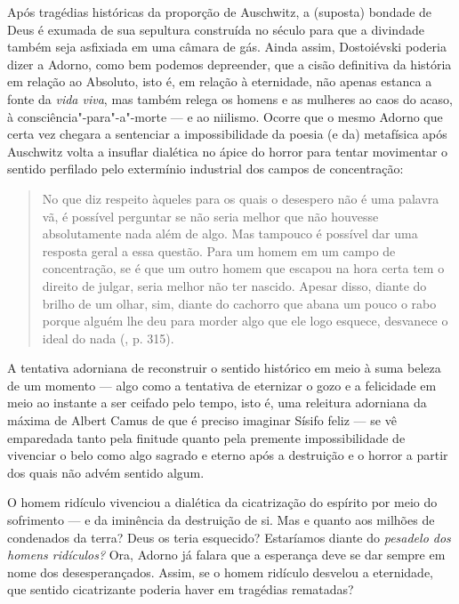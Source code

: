 Após tragédias históricas da proporção de Auschwitz, a (suposta) bondade
de Deus é exumada de sua sepultura construída no século  para que a
divindade também seja asfixiada em uma câmara de gás. Ainda assim,
Dostoiévski poderia dizer a Adorno, como bem podemos depreender, que a
cisão definitiva da história em relação ao Absoluto, isto é, em relação
à eternidade, não apenas estanca a fonte da \emph{vida viva}, mas também
relega os homens e as mulheres ao caos do acaso, à
consciência"-para"-a"-morte --- e ao niilismo. Ocorre que o mesmo Adorno que
certa vez chegara a sentenciar a impossibilidade da poesia (e da)
metafísica após Auschwitz volta a insuflar dialética no ápice do horror
para tentar movimentar o sentido perfilado pelo extermínio industrial
dos campos de concentração:

\begin{quote}
No que diz respeito àqueles para os quais o desespero não é uma palavra
vã, é possível perguntar se não seria melhor que não houvesse
absolutamente nada além de algo. Mas tampouco é possível dar uma
resposta geral a essa questão. Para um homem em um campo de
concentração, se é que um outro homem que escapou na hora certa tem o
direito de julgar, seria melhor não ter nascido. Apesar disso, diante do
brilho de um olhar, sim, diante do cachorro que abana um pouco o rabo
porque alguém lhe deu para morder algo que ele logo esquece, desvanece o
ideal do nada (, p. 315).
\end{quote}

A tentativa adorniana de reconstruir o sentido histórico em meio à suma
beleza de um momento --- algo como a tentativa de eternizar o gozo e a
felicidade em meio ao instante a ser ceifado pelo tempo, isto é, uma
releitura adorniana da máxima de Albert Camus de que é preciso imaginar
Sísifo feliz --- se vê emparedada tanto pela finitude quanto pela
premente impossibilidade de vivenciar o belo como algo sagrado e eterno
após a destruição e o horror a partir dos quais não advém sentido algum.

O homem ridículo vivenciou a dialética da cicatrização do espírito por
meio do sofrimento --- e da iminência da destruição de si. Mas e quanto
aos milhões de condenados da terra? Deus os teria esquecido? Estaríamos
diante do \emph{pesadelo dos homens ridículos?} Ora, Adorno já falara
que a esperança deve se dar sempre em nome dos desesperançados. Assim,
se o homem ridículo desvelou a eternidade, que sentido cicatrizante
poderia haver em tragédias rematadas?


